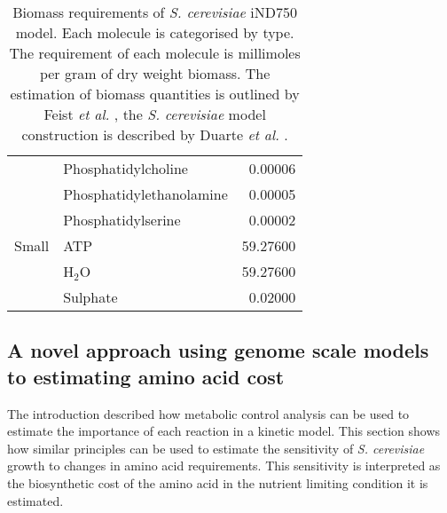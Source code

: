 \begin{table}
\begin{footnotesize}
\begin{tabular}{l l r}
                   & Phosphatidylcholine            &  0.00006                             \\
                   & Phosphatidylethanolamine       &  0.00005                             \\
                   & Phosphatidylserine             &  0.00002                             \\ \midrule
      Small        & ATP                            & 59.27600                             \\
                   & H$_2$O                         & 59.27600                             \\
                   & Sulphate                       &  0.02000                             \\ \bottomrule
  \end{tabular}
  \end{footnotesize}
  \caption[Biomass requirements \emph{S. cerevisiae} iND750 model]{Biomass requirements of \emph{S. cerevisiae} iND750 model. Each molecule is categorised by type. The requirement of each molecule is millimoles per gram of dry weight biomass. The estimation of biomass quantities is outlined by Feist \emph{et al.} \cite{feist2009}, the \emph{S. cerevisiae} model construction is described by Duarte \emph{et al.} \cite{duarte2004a}.}
  \label{table:biomass_requirements}
\end{table}%

\subsection{A novel approach using genome scale models to estimating amino acid cost}\label{section:amino_acid_cost_estimation}%

The introduction described how metabolic control analysis can be used to estimate the importance of each reaction in a kinetic model. This section shows how similar principles can be used to estimate the sensitivity of \emph{S. cerevisiae} growth to changes in amino acid requirements. This sensitivity is interpreted as the biosynthetic cost of the amino acid in the nutrient limiting condition it is estimated.

